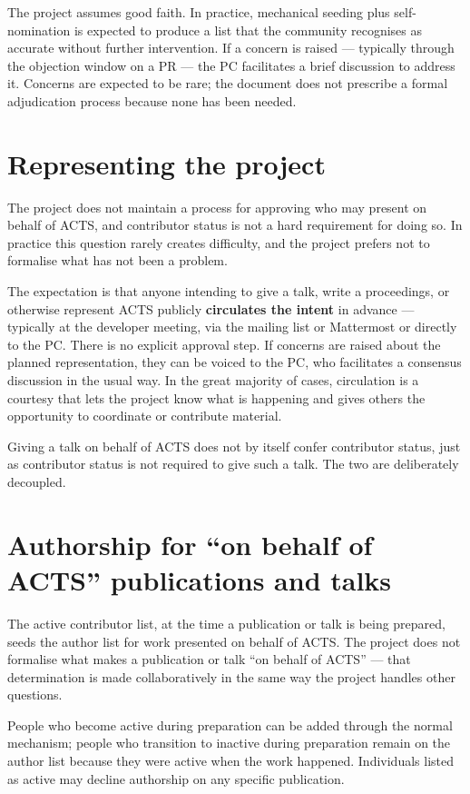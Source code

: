 \documentclass[11pt,a4paper]{article}
\begin{document}
The project assumes good faith. In practice, mechanical seeding plus self-nomination
is expected to produce a list that the community recognises as accurate without
further intervention. If a concern is raised --- typically through the objection
window on a PR --- the PC facilitates a brief discussion to address it. Concerns
are expected to be rare; the document does not prescribe a formal adjudication
process because none has been needed.

\section*{Representing the project}

The project does not maintain a process for approving who may present on behalf of
ACTS, and contributor status is not a hard requirement for doing so. In practice
this question rarely creates difficulty, and the project prefers not to formalise
what has not been a problem.

The expectation is that anyone intending to give a talk, write a proceedings, or
otherwise represent ACTS publicly \textbf{circulates the intent} in advance ---
typically at the developer meeting, via the mailing list or Mattermost or
directly to the PC. There is no explicit approval step. If concerns are raised
about the planned representation, they can be voiced to the PC, who facilitates
a consensus discussion in the usual way. In the great majority of cases,
circulation is a courtesy that lets the project know what is happening and gives
others the opportunity to coordinate or contribute material.

Giving a talk on behalf of ACTS does not by itself confer contributor status, just
as contributor status is not required to give such a talk. The two are deliberately
decoupled.

\section*{Authorship for ``on behalf of ACTS'' publications and talks}

The active contributor list, at the time a publication or talk is being prepared,
seeds the author list for work presented on behalf of ACTS. The project does not
formalise what makes a publication or talk ``on behalf of ACTS'' --- that
determination is made collaboratively in the same way the project handles other
questions.

People who become active during preparation can be added through the normal
mechanism; people who transition to inactive during preparation remain on the
author list because they were active when the work happened. Individuals listed as
active may decline authorship on any specific publication.
\end{document}
